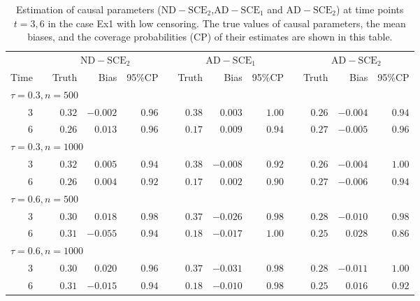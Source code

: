 \documentclass[APA,Times1COL]{WileyNJDv5} %
\theoremstyle{plain}
\begin{document}
\begin{center}
\begin{table}[!h]%
\caption{Estimation of causal parameters ($\operatorname{ND-SCE_2}$,$\operatorname{AD-SCE_1}$ and $\operatorname{AD-SCE_2}$) at time points $t=3,6$ in the case Ex1 with low censoring. The true values of causal parameters, the mean biases, and the coverage probabilities (CP) of their estimates are shown in this table.}
\label{tab:est_sce_cp}
\begin{tabular*}{\textwidth}{@{\extracolsep\fill}rrrrrrrrrrrrr@{}}
\toprule
\multicolumn{1}{c}{}&\multicolumn{1}{c}{}&\multicolumn{3}{c}{$\operatorname{ND-SCE_2}$}&\multicolumn{1}{c}{}&\multicolumn{3}{c}{$\operatorname{AD-SCE_1}$ }&\multicolumn{1}{c}{}&\multicolumn{3}{c}{$\operatorname{AD-SCE_2}$}\\
\cline{3-5}\cline{7-9}\cline{11-13}
Time& &Truth&Bias&95\%CP& &Truth&Bias&95\%CP& &Truth&Bias&95\%CP\\
\midrule
\multicolumn{5}{l}{$\tau=0.3,n=500$}\\
$3$&&$0.32$&$-0.002$&$0.96$&&$0.38$&$0.003$&$1.00$&&$0.26$&$-0.004$&$0.94$\\
$6$&&$0.26$&$ 0.013$&$0.96$&&$0.17$&$0.009$&$0.94$&&$0.27$&$-0.005$&$0.96$\\
\midrule
\multicolumn{5}{l}{$\tau=0.3, n=1000$}\\
$3$&&$0.32$&$0.005$&$0.94$&&$0.38$&$-0.008$&$0.92$&&$0.26$&$-0.004$&$1.00$\\
$6$&&$0.26$&$0.004$&$0.92$&&$0.17$&$ 0.002$&$0.90$&&$0.27$&$-0.006$&$0.94$\\
\midrule
\multicolumn{5}{l}{$\tau=0.6, n=500$}\\
3&&$0.30$&$ 0.018$&$0.98$&&$0.37$&$-0.026$&$0.98$&&$0.28$&$-0.010$&$0.98$\\
$6$&&$0.31$&$-0.055$&$0.94$&&$0.18$&$-0.017$&$1.00$&&$0.25$&$ 0.028$&$0.86$\\
\midrule
\multicolumn{5}{l}{$\tau=0.6, n=1000$}\\
$3$&&$0.30$&$ 0.020$&$0.96$&&$0.37$&$-0.031$&$0.98$&&$0.28$&$-0.011$&$1.00$\\
$6$&&$0.31$&$-0.015$&$0.94$&&$0.18$&$-0.010$&$0.98$&&$0.25$&$ 0.016$&$0.92$\\
\bottomrule
\end{tabular*}
\end{table}
\end{center}
\end{document}
